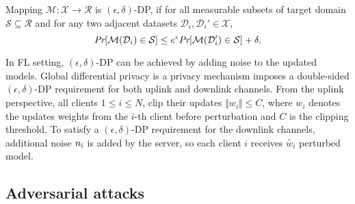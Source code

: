 \begin{definition}
Mapping $\mathcal M: \mathcal{X}\rightarrow \mathcal{R}$ is $(\epsilon, \delta)$-DP,
if for all measurable subsets of target domain $\mathcal S\subseteq \mathcal{R}$ and for any two adjacent datasets $\mathcal D_i, \mathcal D_i'\in \mathcal{X}$, 
\begin{equation}\label{equ:Differential privacy}
\emph{Pr}[\mathcal M(\mathcal D_i)\in \mathcal S]\leq e^{\epsilon}\emph{Pr}[\mathcal M(\mathcal D_i')\in \mathcal S]+\delta.
\end{equation}
\end{definition}
In FL setting,  $(\epsilon, \delta)$-DP can be achieved by adding noise to the updated models.
Global differential privacy is a privacy mechanism imposes a double-sided $(\epsilon, \delta)$-DP requirement for both uplink and downlink channels\cite{wei2020federated}.
From the uplink perspective, all clients $1\leq i\leq N$, clip their updates  $\Vert{w}_{i}\Vert \leq C$, where ${w}_{i}$ denotes the updates weights from the $i$-th client before perturbation and $C$ is the clipping threshold. To satisfy a $(\epsilon, \delta)$-DP requirement for the downlink channels, additional noise ${n}_{\text i}$ is   added by the server, so each client $i$ receives $\tilde{w_i}$ perturbed model\cite{wei2020federated}.

 




\subsection{Adversarial attacks }

